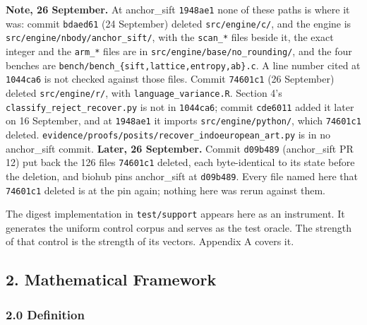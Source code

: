 \textbf{Note, 26 September.} At anchor\_sift \texttt{1948ae1} none of these paths is where it was:
commit \texttt{bdaed61} (24 September) deleted \texttt{src/\allowbreak{}engine/\allowbreak{}c/}, and
the engine is \texttt{src/\allowbreak{}engine/\allowbreak{}nbody/\allowbreak{}anchor\_sift/},
with the \texttt{scan\_*} files beside it, the exact integer and the \texttt{arm\_*} files are in
\texttt{src/\allowbreak{}engine/\allowbreak{}base/\allowbreak{}no\_rounding/}, and the four benches
are \texttt{bench/\allowbreak{}bench\_\allowbreak{}\{sift,\allowbreak{}lattice,\allowbreak{}entropy,\allowbreak{}ab\}.\allowbreak{}c}.
A line number cited at \texttt{1044ca6} is not checked against those files. Commit \texttt{74601c1}
(26 September) deleted \texttt{src/\allowbreak{}engine/\allowbreak{}r/}, with
\texttt{language\_\allowbreak{}variance.\allowbreak{}R}. Section 4's
\texttt{classify\_\allowbreak{}reject\_\allowbreak{}recover.\allowbreak{}py} is not in
\texttt{1044ca6}; commit \texttt{cde6011} added it later on 16 September, and at \texttt{1948ae1} it
imports \texttt{src/\allowbreak{}engine/\allowbreak{}python/}, which \texttt{74601c1} deleted.
\texttt{evidence/\allowbreak{}proofs/\allowbreak{}posits/\allowbreak{}recover\_\allowbreak{}indoeuropean\_\allowbreak{}art.\allowbreak{}py}
is in no anchor\_sift commit.
\textbf{Later, 26 September.} Commit \texttt{d09b489} (anchor\_sift PR 12) put back the 126 files
\texttt{74601c1} deleted, each byte-identical to its state before the deletion, and biohub pins
anchor\_sift at \texttt{d09b489}. Every file named here that \texttt{74601c1} deleted is at the pin
again; nothing here was rerun against them.

The digest implementation in \texttt{test/\allowbreak{}support} appears here as an instrument. It generates the uniform control corpus and serves as the test oracle. The strength of that control is the strength of its vectors. Appendix A covers it.

\subsection{2. Mathematical Framework}

\subsubsection{2.0 Definition}

